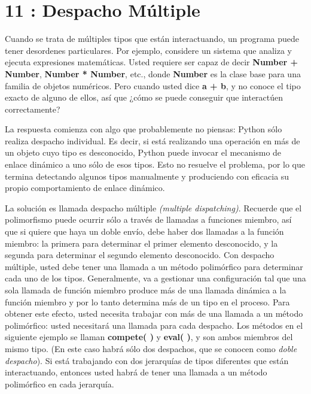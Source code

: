 \section*{11 : Despacho Múltiple}
\label{sec:dm}

Cuando se trata de múltiples tipos que están interactuando, un programa puede tener desordenes particulares. Por ejemplo, considere un sistema que analiza y ejecuta expresiones matemáticas. Usted requiere ser capaz de decir \textbf{Number + Number}, \textbf{Number * Number}, etc., donde \textbf{Number} es la clase base para una familia de objetos numéricos. Pero cuando usted dice \textbf{a + b}, y no conoce el tipo exacto de alguno de ellos, así que ¿cómo se puede conseguir que interactúen correctamente?  \newline

La respuesta comienza con algo que probablemente no piensas: Python sólo realiza despacho individual. Es decir, si está realizando una operación en más de un objeto cuyo tipo es desconocido, Python puede invocar el mecanismo de enlace dinámico a uno sólo de esos tipos. Esto no resuelve el problema, por lo que termina detectando algunos tipos manualmente y produciendo con eficacia su propio comportamiento de enlace dinámico.   \newline

La solución es llamada despacho múltiple \textit{(multiple dispatching)}. Recuerde que el polimorfismo puede ocurrir sólo a través de llamadas a funciones miembro, así que si quiere que haya un doble envío, debe haber dos llamadas a la función miembro: la primera para determinar el primer elemento desconocido, y la segunda para determinar el segundo elemento desconocido. Con despacho múltiple, usted debe tener una llamada a un método polimórfico para determinar cada uno de los tipos. Generalmente, va a gestionar una configuración tal que una sola llamada de función miembro produce más de una llamada dinámica a la función miembro y por lo tanto determina más de un tipo en el proceso. Para obtener este efecto, usted necesita trabajar con más de una llamada a un método polimórfico: usted necesitará una llamada para cada despacho. Los métodos en el siguiente ejemplo se llaman \textbf{compete( )} y \textbf{eval( )}, y son ambos miembros del mismo tipo. (En este caso habrá sólo dos despachos, que se conocen como \textit{doble despacho}). Si está trabajando con dos jerarquías de tipos diferentes que están interactuando, entonces usted habrá de tener una llamada a un método polimórfico en cada jerarquía.  \newline

